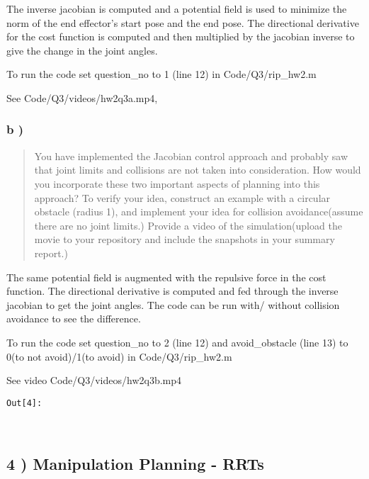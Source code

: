 \documentclass{article}
\begin{document}
    The inverse jacobian is computed and a potential field is used to
minimize the norm of the end effector's start pose and the end pose. The
directional derivative for the cost function is computed and then
multiplied by the jacobian inverse to give the change in the joint
angles.

To run the code set question\_no to 1 (line 12) in Code/Q3/rip\_hw2.m

See Code/Q3/videos/hw2q3a.mp4,


    \subsubsection{b )}


    \begin{quote}
You have implemented the Jacobian control approach and probably saw that
joint limits and collisions are not taken into consideration. How would
you incorporate these two important aspects of planning into this
approach? To verify your idea, construct an example with a circular
obstacle (radius 1), and implement your idea for collision
avoidance(assume there are no joint limits.) Provide a video of the
simulation(upload the movie to your repository and include the snapshots
in your summary report.)
\end{quote}

    The same potential field is augmented with the repulsive force in the
cost function. The directional derivative is computed and fed through
the inverse jacobian to get the joint angles. The code can be run with/
without collision avoidance to see the difference.

To run the code set question\_no to 2 (line 12) and avoid\_obstacle
(line 13) to 0(to not avoid)/1(to avoid) in Code/Q3/rip\_hw2.m

See video Code/Q3/videos/hw2q3b.mp4

\texttt{\color{outcolor}Out[{\color{outcolor}4}]:}
    
    \begin{center}
    \end{center}
    { \hspace*{\fill} \\}
    


    \subsection{4 ) Manipulation Planning - RRTs}
\end{document}
